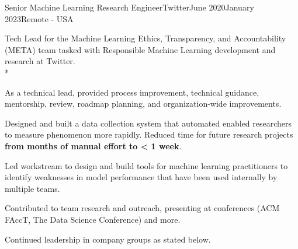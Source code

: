 \documentclass[print]{friggeri-cv} %
\begin{document}
\begin{job}
  {\twittericon}{Senior Machine Learning Research Engineer}{Twitter}{June 2020}{January 2023}{Remote - USA}{
      Tech Lead for the Machine Learning Ethics, Transparency, and Accountability
      (META) team tasked with Responsible Machine Learning development and
      research at Twitter.\\*
      \begin{myitemize}
        \item As a technical lead, provided process improvement, technical guidance,
        mentorship, review, roadmap planning, and organization-wide improvements. 
        
        \item Designed and built a data collection system that
        automated enabled researchers to measure phenomenon more rapidly. Reduced time
        for future research projects \textbf{from months of manual effort to < 1 week}.
        
        \item Led workstream to design and build tools for machine learning
        practitioners to identify weaknesses in model performance that have been
        used internally by multiple teams.
        
        \item Contributed to team research\autocite{twitter_htl_racial_bias}\autocite{twitter_recsys_distributional_inequality}
        and outreach, presenting at conferences (ACM FAccT\autocite{facct_2022_talk}, The Data Science Conference\autocite{datascience_2022_talk})
        and more\autocite{privacy_enchancing_tech_post}.
        \item Continued leadership in company groups as stated below.

      \end{myitemize}
  }
  \end{job}
\end{document}
